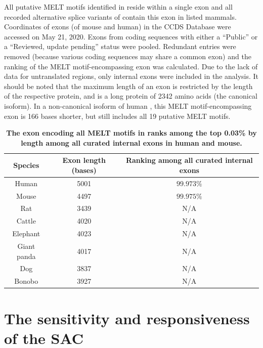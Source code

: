 \begin{table}[H]
    \renewcommand{\arraystretch}{1.5}
    \caption{\textbf{The exon encoding all MELT motifs in  ranks among the top 0.03\% by length among all curated internal exons in human and mouse.}}
    \noindent\justifying All putative MELT motifs identified in \cite{MELTEvolution} reside within a single exon and all recorded alternative splice variants of  contain this exon in listed mammals. Coordinates of exons (of mouse and human) in the CCDS Database \cite{CCDS} were accessed on May 21, 2020. Exons from coding sequences with either a ``Public'' or a ``Reviewed, update pending'' status were pooled. Redundant entries were removed (because various coding sequences may share a common exon) and the ranking of the MELT motif-encompassing exon was calculated. Due to the lack of data for untranslated regions, only internal exons were included in the analysis. It should be noted that the maximum length of an exon is restricted by the length of the respective protein, and  is a long protein of \SI{2342}{} amino acids (the canonical isoform). In a non-canonical isoform of human , this MELT motif-encompassing exon is 166 bases shorter, but still includes all 19 putative MELT motifs.
    \label{ExonLength}
    \begin{center}
        \begin{tabular}{c c c}
            \hline
            Species & Exon length (bases) & Ranking among all curated internal exons\\
            \hline
            Human & 5001 & $99.973\%$\\
            Mouse & 4497 & $99.975\%$\\
            Rat & 3439 & N/A\\
            Cattle & 4020 & N/A\\
            Elephant & 4023 & N/A\\ %
            Giant panda & 4017 & N/A\\
            Dog & 3837 & N/A\\
            Bonobo & 3927 & N/A\\
            \hline
        \end{tabular}
    \end{center}
\end{table}

\section{The sensitivity and responsiveness of the SAC}

